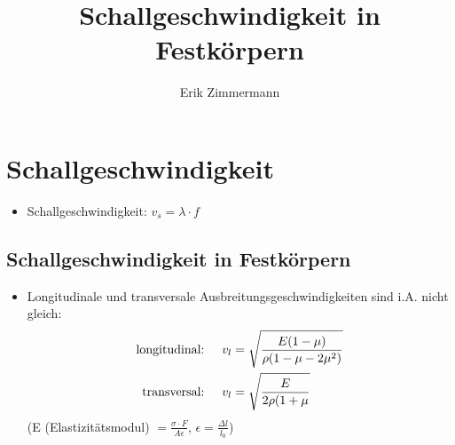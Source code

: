 \documentclass[10pt,a4paper]{article}
\author{Erik Zimmermann}
\title{Schallgeschwindigkeit in Festkörpern}
\begin{document}
\maketitle
\newpage
\section{Schallgeschwindigkeit}
\begin{itemize}
\item Schallgeschwindigkeit: $v_s= \lambda \cdot f $
\end{itemize}
\subsection{Schallgeschwindigkeit in Festkörpern}
\begin{itemize}
\item Longitudinale und transversale Ausbreitungsgeschwindigkeiten sind i.A. nicht gleich:
\begin{align}
\text{longitudinal:} \hspace{0,5cm} v_l&=\sqrt{\frac{E(1-\mu)}{\rho(1-\mu-2\mu^2)}}\\
\text{transversal:} \hspace{0,5cm} v_l&=\sqrt{\frac{E}{2\rho(1+\mu}}
\end{align}
(E (Elastizitätsmodul) $=\frac{\sigma \cdot F}{A\epsilon}$, $\epsilon=\frac{\Delta l}{l_0}$)
\end{itemize}
\end{document}
